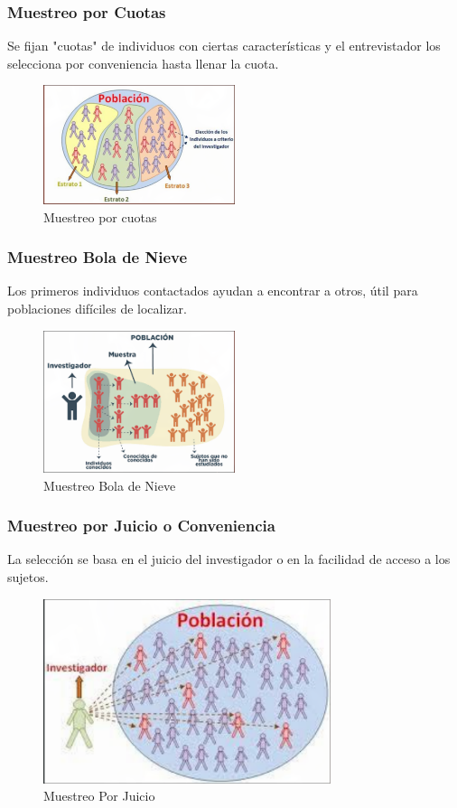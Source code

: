 \documentclass[12pt, letterpaper]{article}
\begin{document}
\subsubsection{Muestreo por Cuotas}
Se fijan "cuotas" de individuos con ciertas características y el entrevistador los selecciona por conveniencia hasta llenar la cuota.
\begin{figure}[htbp]
    \centering
    \includegraphics[width=0.5\textwidth]{MPCU}
    \caption{Muestreo por cuotas}
    \label{fig:MPCU}
\end{figure}

\subsubsection{Muestreo Bola de Nieve}
Los primeros individuos contactados ayudan a encontrar a otros, útil para poblaciones difíciles de localizar.
\begin{figure}[htbp]
    \centering
    \includegraphics[width=0.5\textwidth]{MBN}
    \caption{Muestreo Bola de Nieve}
    \label{fig:MBC}
\end{figure}

\subsubsection{Muestreo por Juicio o Conveniencia}
La selección se basa en el juicio del investigador o en la facilidad de acceso a los sujetos.
\begin{figure}[htbp]
    \centering
    \includegraphics[width=0.75\textwidth]{MPJ}
    \caption{Muestreo Por Juicio}
    \label{fig:MPJ}
\end{figure}
\end{document}

